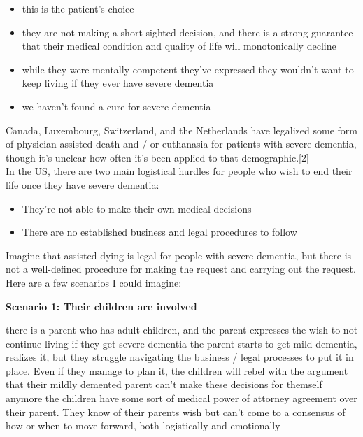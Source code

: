 \documentclass{proposalnsf}
\begin{document}
\begin{itemize}
    \item{this is the patient's choice}
    \item{they are not making a short-sighted decision, and there is a strong guarantee that their medical condition and quality of life will monotonically decline}
\end{itemize}

\begin{itemize}
    \item{while they were mentally competent they've expressed they wouldn't want to keep living if they ever have severe dementia}
    \item{we haven't found a cure for severe dementia}
\end{itemize}


\bigskip
\bigskip

Canada, Luxembourg, Switzerland, and the Netherlands have legalized some form of physician-assisted death and / or euthanasia for patients with severe dementia, though it's unclear how often it's been applied to that demographic.[2]
\\

In the US, there are two main logistical hurdles for people who wish to end their life once they have severe dementia:
\begin{itemize}
    \item{They're not able to make their own medical decisions}
    \item{There are no established business and legal procedures to follow}
\end{itemize}
    

Imagine that assisted dying is legal for people with severe dementia, but there is not a well-defined procedure for making the request and carrying out the request. Here are a few scenarios I could imagine:

\textbf{Scenario 1: Their children are involved}

    there is a parent who has adult children, and the parent expresses the wish to not continue living if they get severe dementia
    the parent starts to get mild dementia, realizes it, but they struggle navigating the business / legal processes to put it in place. Even if they manage to plan it, the children will rebel with the argument that their mildly demented parent can't make these decisions for themself anymore
    the children have some sort of medical power of attorney agreement over their parent. They know of their parents wish but can't come to a consensus of how or when to move forward, both logistically and emotionally
\end{document}
